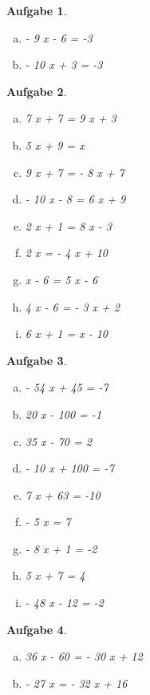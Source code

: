 \documentclass[12pt,fleqn]{article}
\theoremstyle{aufg}
\newtheorem{aufgabe}{Aufgabe}
\theoremstyle{bsp}
\begin{document}
\begin{flushleft}
\begin{aufgabe}
\begin{multicols}{3}
\begin{enumerate}[a)]
- 3 x - 9 = -6
\item 
- 9 x - 6 = -3
\item 
- 10 x + 3 = -3
\end{enumerate} 
\end{multicols} 
\end{aufgabe} 
\begin{aufgabe} ~ \\ 
\begin{multicols}{3} 
\begin{enumerate}[a)] 
\item 
7 x + 7 = 9 x + 3
\item 
5 x + 9 = x
\item 
9 x + 7 = - 8 x + 7
\item 
- 10 x - 8 = 6 x + 9
\item 
2 x + 1 = 8 x - 3
\item 
2 x = - 4 x + 10
\item 
x - 6 = 5 x - 6
\item 
4 x - 6 = - 3 x + 2
\item 
6 x + 1 = x - 10
\end{enumerate} 
\end{multicols} 
\end{aufgabe} 
\begin{aufgabe} ~ \\ 
\begin{multicols}{3} 
\begin{enumerate}[a)] 
\item 
- 54 x + 45 = -7
\item 
20 x - 100 = -1
\item 
35 x - 70 = 2
\item 
- 10 x + 100 = -7
\item 
7 x + 63 = -10
\item 
- 5 x = 7
\item 
- 8 x + 1 = -2
\item 
5 x + 7 = 4
\item 
- 48 x - 12 = -2
\end{enumerate} 
\end{multicols} 
\end{aufgabe} 
\begin{aufgabe} ~ \\ 
\begin{multicols}{2} 
\begin{enumerate}[a)] 
\item 
36 x - 60 = - 30 x + 12
\item 
- 27 x = - 32 x + 16

\end{enumerate}
\end{multicols}
\end{aufgabe}
\end{flushleft}
\end{document}
